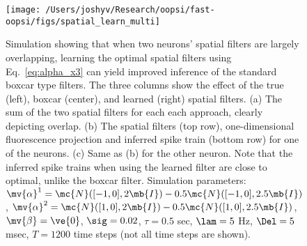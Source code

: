 


\begin{figure}[h!]
\centering \texttt{[image: /Users/joshyv/Research/oopsi/fast-oopsi/figs/spatial\_learn\_multi]}
\caption[overlapping spatial filters can be estimated]{Simulation showing that when two neurons' spatial filters are largely overlapping, learning the optimal spatial filters using Eq.~\ref{eq:alpha_x3} can yield improved inference of the standard boxcar type filters.  The three columns show the effect of the true (left), boxcar (center), and learned (right) spatial filters.  (a) The sum of the two spatial filters for each each approach, clearly depicting overlap. (b) The spatial filters (top row), one-dimensional fluorescence projection and inferred spike train (bottom row) for one of the neurons.  (c) Same as (b) for the other neuron.    Note that the inferred spike trains when using the learned filter are close to optimal, unlike the boxcar filter.  Simulation parameters: $\mv{\alpha}^1=\mc{N}([-1, 0],2 \mb{I})-0.5 \mc{N}([-1, 0],2.5 \mb{I})$, $\mv{\alpha}^2=\mc{N}([1, 0],2 \mb{I})-0.5 \mc{N}([1, 0],2.5 \mb{I})$, $\mv{\beta}=\ve{0}$,  $\sig=0.02$, $\tau=0.5$ sec, $\lam=5$ Hz, $\Del=5$ msec, $T=1200$ time steps (not all time steps are shown).} \label{fig:spatial_multi_learn}
\end{figure}



